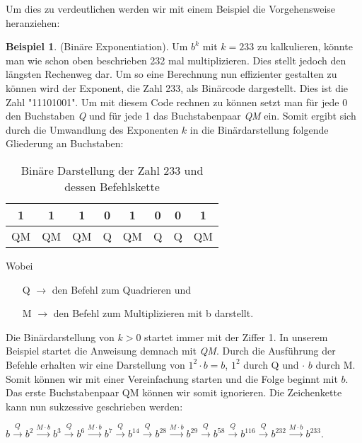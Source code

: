 \documentclass[12pt,a4paper]{article}
\theoremstyle{definition}
\newtheorem{bsp}{Beispiel}[subsection]
\begin{document}
Um dies zu verdeutlichen werden wir mit einem Beispiel die Vorgehensweise heranziehen:
\begin{bsp}(Binäre Exponentiation).\newline
Um $b^k$ mit $k=233$ zu kalkulieren, könnte man wie schon oben beschrieben 232 mal multiplizieren.
Dies stellt jedoch den längsten Rechenweg dar.
Um so eine Berechnung nun effizienter gestalten zu können wird der Exponent, die Zahl 233, als Binärcode dargestellt.
Dies ist die Zahl "11101001".
Um mit diesem Code rechnen zu können setzt man für jede 0 den Buchstaben \textit{Q} und für jede 1 das Buchstabenpaar \textit{QM} ein.
Somit ergibt sich durch die Umwandlung des Exponenten $k$ in die Binärdarstellung folgende Gliederung an Buchstaben:

\begin{table}[h]\centering
\begin{tabular}{c|c|c|c|c|c|c|c}
1 & 1 & 1 & 0 & 1 & 0 & 0 & 1 \\
\hline
QM & QM & QM & Q & QM & Q & Q & QM \\
\end{tabular}
\caption{Binäre Darstellung der Zahl 233 und dessen Befehlskette}
\label{tab:Binäre Darstellung der Zahl 233 und desses Befehlskette}
\end{table}

Wobei
\begin{itemize}
    \item[Q] $\rightarrow$ den Befehl zum Quadrieren und
    \item[M] $\rightarrow$ den Befehl zum Multiplizieren mit b darstellt.
\end{itemize}

Die Binärdarstellung von $k > 0$ startet immer mit der Ziffer 1.
In unserem Beispiel startet die Anweisung demnach mit \textit{QM}.
Durch die Ausführung der Befehle erhalten wir eine Darstellung von ${1^2 \cdot b = b}$, ${1^2}$ durch Q und $\cdot$ $b$ durch M.
Somit können wir mit einer Vereinfachung starten und die Folge beginnt mit $b$.
Das erste Buchstabenpaar QM können wir somit ignorieren.\newline
Die Zeichenkette kann nun sukzessive geschrieben werden:

$b\stackrel{Q}{\longrightarrow}b^2\stackrel{M \cdot b}{\longrightarrow}b^3\stackrel{Q}{\longrightarrow}b^6\stackrel{M \cdot b}{\longrightarrow}b^7\stackrel{Q}{\longrightarrow}b^{14}\stackrel{Q}{\longrightarrow}b^{28}\stackrel{M \cdot b}{\longrightarrow}b^{29}\stackrel{Q}{\longrightarrow}b^{58}\stackrel{Q}{\longrightarrow}b^{116}\stackrel{Q}{\longrightarrow}b^{232}\stackrel{M \cdot b}{\longrightarrow}b^{233}$.


\end{bsp}
\end{document}
